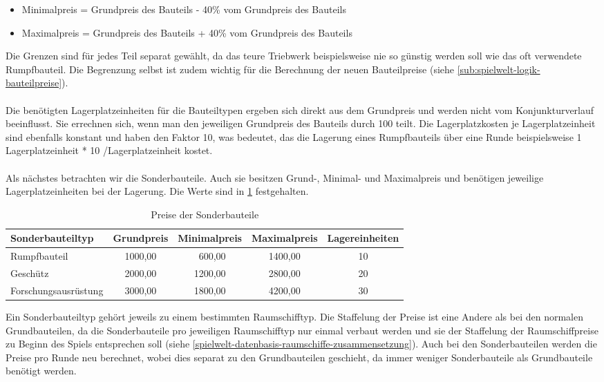 \begin{itemize}
\item[] Minimalpreis = Grundpreis des Bauteils - 40\% vom Grundpreis des Bauteils
\item[] Maximalpreis = Grundpreis des Bauteils + 40\% vom Grundpreis des Bauteils
\end{itemize}

Die Grenzen sind für jedes Teil separat gewählt, da das teure Triebwerk beispielsweise nie so günstig werden soll wie das oft verwendete Rumpfbauteil. Die Begrenzung selbst ist zudem wichtig für die Berechnung der neuen Bauteilpreise (siehe \ref{sub:spielwelt-logik-bauteilpreise}). 
\\
\\
Die benötigten Lagerplatzeinheiten für die Bauteiltypen ergeben sich direkt aus dem Grundpreis und werden nicht vom Konjunkturverlauf beeinflusst. Sie errechnen sich, wenn man den jeweiligen Grundpreis des Bauteils durch 100 teilt. Die Lagerplatzkosten je Lagerplatzeinheit sind ebenfalls konstant und haben den Faktor 10, was bedeutet, das die Lagerung eines Rumpfbauteils über eine Runde beispielsweise 1 Lagerplatzeinheit * 10  \curr{}/Lagerplatzeinheit kostet.
\\
\\ 
Als nächstes betrachten wir die Sonderbauteile. Auch sie besitzen Grund-, Minimal- und Maximalpreis und benötigen jeweilige Lagerplatzeinheiten bei der Lagerung. Die Werte sind in \ref{tab:spielwelt-datenbasis-raumschiffe-raumschiffbauteile-1} festgehalten.

\begin{table}[htb]\small
     \centering
     \begin{tabular}{ | l | c | c | c | c |   }
          \hline
          Sonderbauteiltyp & Grundpreis & Minimalpreis & Maximalpreis & Lagereinheiten \\
          \hline \hline
          Rumpfbauteil & 1000,00\curr{} & \ 600,00\curr{} & 1400,00\curr{} & 10 \\ \hline
          Geschütz & 2000,00\curr{} & 1200,00\curr{} & 2800,00\curr{} & 20 \\ \hline
          Forschungsausrüstung & 3000,00\curr{} & 1800,00\curr{} & 4200,00\curr{} & 30 \\
          \hline
     \end{tabular}
     \caption{Preise der Sonderbauteile}
     \label{tab:spielwelt-datenbasis-raumschiffe-raumschiffbauteile-1}
\end{table}

Ein Sonderbauteiltyp gehört jeweils zu einem bestimmten Raumschifftyp. Die Staffelung der Preise ist eine Andere als bei den normalen Grundbauteilen, da die Sonderbauteile pro jeweiligen Raumschifftyp nur einmal verbaut werden und sie der Staffelung der Raumschiffpreise zu Beginn des Spiels entsprechen soll (siehe \ref{spielwelt-datenbasis-raumschiffe-zusammensetzung}). Auch bei den Sonderbauteilen werden die Preise pro Runde neu berechnet, wobei dies separat zu den Grundbauteilen geschieht, da immer weniger Sonderbauteile als Grundbauteile benötigt werden.
